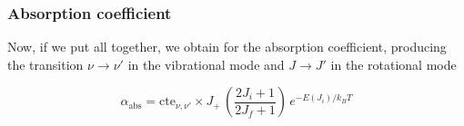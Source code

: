 \subsubsection{Absorption coefficient}
\label{S:absorpt-coeff}

Now, if we put all together, we obtain for the absorption coefficient, producing the transition $\nu \to \nu'$ in the vibrational mode and $J \to J'$ in the rotational mode

\begin{equation}
  \label{Q:absorption-coeff-J}
  \alpha_{\text{abs}} = \text{cte}_{\nu,\nu'} \times J_{+}\, \left( \frac{2 J_{i}+1}{2 J_{f}+1}\right)\, e^{-E(J_{i})/k_{B}T} 
\end{equation}



